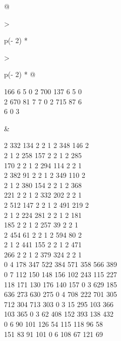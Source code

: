 \begin{question}
\begin{longtable}[]{@{}

  >{\raggedright\arraybackslash}p{(\columnwidth - 2\tabcolsep) * }

  >{\raggedright\arraybackslash}p{(\columnwidth - 2\tabcolsep) * }@{}}
\begin{minipage}[t]{\linewidth}
166 6 5 0 2 700 137 6 5 0\\

2 670 81 7 7 0 2 715 87 6\\

6 0 3\strut

\end{minipage} & \begin{minipage}[t]{\linewidth}\raggedright

2 332 134 2 2 1 2 348 146 2\\

2 1 2 258 157 2 2 1 2 285\\

170 2 2 1 2 294 114 2 2 1\\

2 382 91 2 2 1 2 349 110 2\\

2 1 2 380 154 2 2 1 2 368\\

221 2 2 1 2 332 202 2 2 1\\

2 512 147 2 2 1 2 491 219 2\\

2 1 2 224 281 2 2 1 2 181\\

185 2 2 1 2 257 39 2 2 1\\

2 454 61 2 2 1 2 594 80 2\\

2 1 2 441 155 2 2 1 2 471\\

266 2 2 1 2 379 324 2 2 1\\

0 4 178 347 522 384 571 358 566 389\\

0 7 112 150 148 156 102 243 115 227\\

118 171 130 176 140 157 0 3 629 185\\

636 273 630 275 0 4 708 222 701 305\\

712 304 713 303 0 3 15 295 103 366\\

103 365 0 3 62 408 152 393 138 432\\

0 6 90 101 126 54 115 118 96 58\\

151 83 91 101 0 6 108 67 121 69\\


\end{minipage}
\end{longtable}
\end{question}
